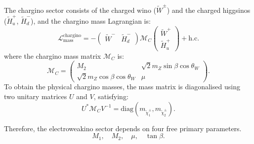 \documentclass[letterpaper,11pt]{article}
\begin{document}
The chargino sector consists of the charged wino ($\tilde{W}^\pm$) and the charged higgsinos ($\tilde{H}_u^+$, $\tilde{H}_d^-$), and the chargino mass Lagrangian is:
\begin{equation}
	\mathcal{L}_{\text{mass}}^{\text{chargino}} = - 
	\begin{pmatrix}
		\tilde{W}^- & \tilde{H}_d^-
	\end{pmatrix} 
	\mathcal{M}_C
	\begin{pmatrix}
		\tilde{W}^+ \\ \tilde{H}_u^+
	\end{pmatrix} + \text{h.c.}
\end{equation}
where the chargino mass matrix $\mathcal{M}_C$ is:
\begin{equation}
	\mathcal{M}_C =
	\begin{pmatrix}
		M_2   & \sqrt{2} m_Z \sin{\beta}\cos{\theta_W} \\
		\sqrt{2} m_Z \cos{\beta} \cos{\theta_W}   & \mu
	\end{pmatrix}.
\end{equation}
To obtain the physical chargino masses, the mass matrix is diagonalised using two unitary matrices $U$ and $V$, satisfying:
\begin{equation}
U^* \mathcal{M}_C V^{-1} = \text{diag}(m_{\tilde{\chi}^\pm_1}, m_{\tilde{\chi}^\pm_2}).
\end{equation}

\par Therefore, the electroweakino sector depends on four free primary parameters.
\begin{equation}\label{eq:freepara}
	M_1, \quad M_2, \quad \mu, \quad \tan{\beta}. 
\end{equation} 
\end{document}
